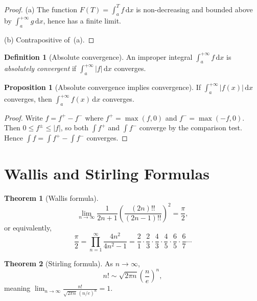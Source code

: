 \documentclass[12pt,a4paper]{book}
\theoremstyle{definition}
\newtheorem{definition}{Definition}[chapter]
\newtheorem{theorem}{Theorem}[chapter]
\newtheorem{proposition}{Proposition}[chapter]
\newcommand{\abs}[1]{\left\lvert #1 \right\rvert}
\newcommand{\dd}{\,\mathrm{d}}
\begin{document}
\begin{proof}
  (a) The function $F(T)=\int_a^T f\dd x$ is non-decreasing and bounded
  above by $\int_a^{+\infty}g\dd x$, hence has a finite limit.

  (b) Contrapositive of~(a).
\end{proof}

\begin{definition}[Absolute convergence]\label{def:abs-conv}
  An improper integral $\int_a^{+\infty}f\dd x$ is
  \emph{absolutely convergent}
  if $\int_a^{+\infty}\abs{f}\dd x$ converges.
\end{definition}

\begin{proposition}[Absolute convergence implies convergence]\label{prop:abs-implies-conv}
  If $\int_a^{+\infty}\abs{f(x)}\dd x$ converges, then
  $\int_a^{+\infty}f(x)\dd x$ converges.
\end{proposition}

\begin{proof}
  Write $f=f^+-f^-$ where $f^+=\max(f,0)$ and $f^-=\max(-f,0)$.  Then
  $0\le f^\pm\le\abs{f}$, so both $\int f^+$ and $\int f^-$ converge
  by the comparison test.  Hence $\int f=\int f^+-\int f^-$ converges.
\end{proof}



\section{Wallis and Stirling Formulas}\label{sec:wallis-stirling}

\begin{theorem}[Wallis formula]\label{thm:wallis}
  \[
    \lim_{n\to\infty}
    \frac{1}{2n+1}
    \left(\frac{(2n)!!}{(2n-1)!!}\right)^2
    = \frac{\pi}{2},
  \]
  or equivalently,
  \[
    \frac{\pi}{2}
    = \prod_{n=1}^{\infty}\frac{4n^2}{4n^2-1}
    = \frac{2}{1}\cdot\frac{2}{3}\cdot\frac{4}{3}\cdot\frac{4}{5}
      \cdot\frac{6}{5}\cdot\frac{6}{7}\cdots
  \]
\end{theorem}

\begin{theorem}[Stirling formula]\label{thm:stirling}
  As $n\to\infty$,
  \[
    n! \sim \sqrt{2\pi n}\left(\frac{n}{e}\right)^n,
  \]
  meaning $\displaystyle\lim_{n\to\infty}
  \frac{n!}{\sqrt{2\pi n}\,(n/e)^n}=1$.
\end{theorem}
\end{document}
